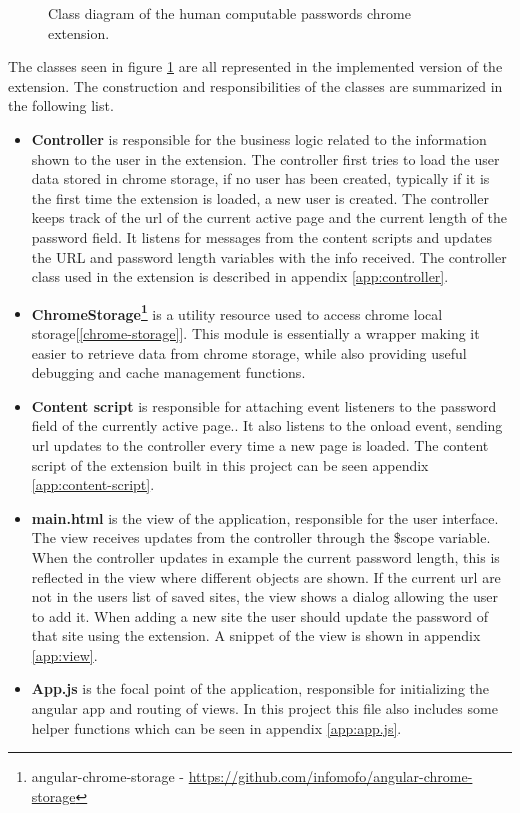 \begin{figure}[h]
    \centering
    \caption{Class diagram of the human computable passwords chrome extension.}
    \label{class-diagram}
\end{figure}

\par The classes seen in figure \ref{class-diagram} are all represented in the implemented version of the extension. The construction and responsibilities of the classes are summarized in the following list.

\begin{itemize}
    \item \textbf{Controller} is responsible for the business logic related to the information shown to the user in the extension. The controller first tries to load the user data stored in chrome storage, if no user has been created, typically if it is the first time the extension is loaded, a new user is created. The controller keeps track of the url of the current active page and the current length of the password field. It listens for messages from the content scripts and updates the URL and password length variables with the info received. The controller class used in the extension is described in appendix \ref{app:controller}.
    \item \textbf{ChromeStorage\footnote{angular-chrome-storage - \url{https://github.com/infomofo/angular-chrome-storage}}} is a utility resource used to access chrome local storage[\autoref{chrome-storage}]. This module is essentially a wrapper making it easier to retrieve data from chrome storage, while also providing useful debugging and cache management functions.
    \item \textbf{Content script} is responsible for attaching event listeners to the password field of the currently active page.. It also listens to the onload event, sending url updates to the controller every time a new page is loaded. The content script of the extension built in this project can be seen appendix \ref{app:content-script}.
    \item \textbf{main.html} is the view of the application, responsible for the user interface. The view receives updates from the controller through the \$scope variable. When the controller updates in example the current password length, this is reflected in the view where different objects are shown. If the current url are not in the users list of saved sites, the view shows a dialog allowing the user to add it. When adding a new site the user should update the password of that site using the extension. A snippet of the view is shown in appendix \ref{app:view}. 
    \item \textbf{App.js} is the focal point of the application, responsible for initializing the angular app and routing of views. In this project this file also includes some helper functions which can be seen in appendix \ref{app:app.js}.
\end{itemize}

